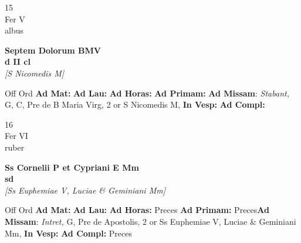 \documentclass[10pt, openany]{book}
\begin{document}
    \begin{center}
        \begin{minipage}{3.5in}
            \vspace{2em}
            \begin{minipage}{0.5in}
                {\Huge 15} \\
                {\normalsize Fer V} \\
                {\normalsize albus}
            \end{minipage}
            \begin{minipage}{3.0in}
                \textbf{ \large Septem Dolorum BMV \\
                \textnormal{\normalsize d II cl}} \\ \textit{[S Nicomedis M]} \\ 
            \end{minipage}
            \begin{justify}Off Ord
                \textbf{Ad Mat: }
                \textbf{Ad Lau: }
                \textbf{Ad Horas: }
                \textbf{Ad Primam: }\textbf{Ad Missam}: \textit{Stabant,} G, C, Pre de B Maria Virg, 2 or S Nicomedis M,  
                \textbf{In Vesp: }
                \textbf{Ad Compl: }
            \end{justify}
        \end{minipage}
    \end{center}

    \begin{center}
        \begin{minipage}{3.5in}
            \vspace{2em}
            \begin{minipage}{0.5in}
                {\Huge 16} \\
                {\normalsize Fer VI} \\
                {\normalsize ruber}
            \end{minipage}
            \begin{minipage}{3.0in}
                \textbf{ \large Ss Cornelii P et Cypriani E Mm \\
                \textnormal{\normalsize sd}} \\ \textit{[Ss Euphemiae V, Luciae \& Geminiani Mm]} \\ 
            \end{minipage}
            \begin{justify}Off Ord
                \textbf{Ad Mat: }
                \textbf{Ad Lau: }
                \textbf{Ad Horas: }Preces
                \textbf{Ad Primam: }Preces\textbf{Ad Missam}: \textit{Intret,} G, Pre de Apostolis, 2 or Ss Euphemiae V, Luciae \& Geminiani Mm,  
                \textbf{In Vesp: }
                \textbf{Ad Compl: }Preces
            \end{justify}
        \end{minipage}
    \end{center}
\end{document}
